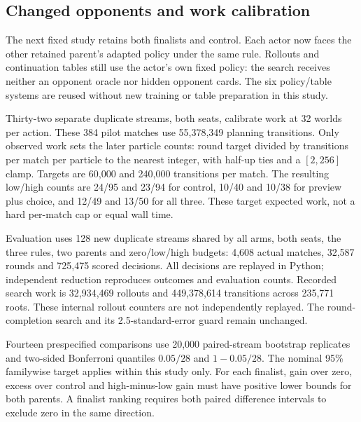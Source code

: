 \FloatBarrier
\subsection{Changed opponents and work calibration}
\label{app:public-stock-robustness}
The next fixed study retains both finalists and control. Each actor now faces
the other retained parent's adapted policy under the same rule. Rollouts and
continuation tables still use the actor's own fixed policy: the search receives
neither an opponent oracle nor hidden opponent cards. The six policy/table
systems are reused without new training or table preparation in this study.

Thirty-two separate duplicate streams, both seats, calibrate work at 32 worlds
per action. These 384 pilot matches use 55,378,349 planning transitions.
Only observed work sets the later particle counts: round target divided by
transitions per match per particle to the nearest integer, with half-up ties
and a $[2,256]$ clamp. Targets are 60,000 and 240,000 transitions per match.
The resulting low/high counts are 24/95 and 23/94 for control, 10/40 and
10/38 for preview plus choice, and 12/49 and 13/50 for all three.
These target expected work, not a hard per-match cap or equal wall time.

Evaluation uses 128 new duplicate streams shared by all arms, both seats,
the three rules, two parents and zero/low/high budgets: 4,608 actual matches,
32,587 rounds and 725,475 scored decisions. All decisions are replayed in
Python; independent reduction reproduces outcomes and evaluation counts.
Recorded search work is 32,934,469 rollouts and 449,378,614 transitions across
235,771 roots. These internal rollout counters are not independently replayed.
The round-completion search and its 2.5-standard-error guard remain unchanged.

Fourteen prespecified comparisons use 20,000 paired-stream bootstrap
replicates and two-sided Bonferroni quantiles $0.05/28$ and $1-0.05/28$.
The nominal 95\% familywise target applies within this study only. For each
finalist, gain over zero, excess over control and high-minus-low gain must
have positive lower bounds for both parents. A finalist ranking requires
both paired difference intervals to exclude zero in the same direction.

\begin{table}[ht]
\centering\small

\caption{All fourteen changed-opponent comparisons, in percentage points.
Intervals are simultaneous paired-bootstrap intervals under the fixed V4
family. Excess subtracts the corresponding control's high-minus-zero gain.
The last two rows compare the finalists' gains, not absolute strength across
different games. Scores count ties as one half.}
\label{tab:public-stock-robustness-comparisons}
\end{table}

